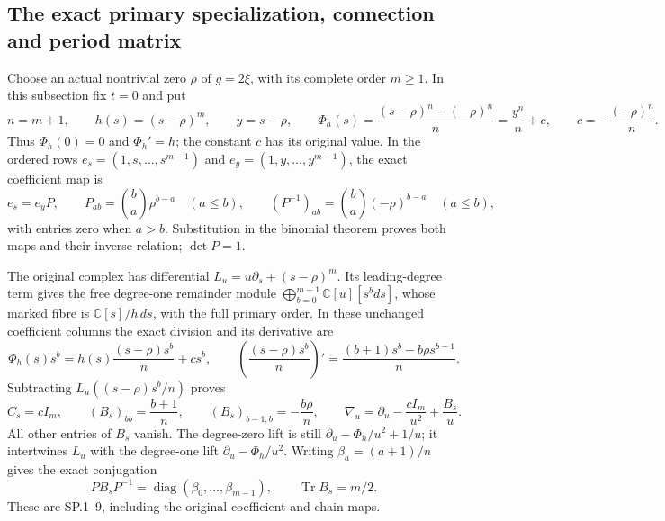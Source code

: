 \subsection{The exact primary specialization, connection and period matrix}

Choose an actual nontrivial zero \(\rho\) of \(g=2\xi\), with its
complete order \(m\geq1\).  In this subsection fix \(t=0\) and put
\[
 n=m+1,\qquad h(s)=(s-\rho)^m,\qquad
 y=s-\rho,\qquad
 \Phi_h(s)=\frac{(s-\rho)^n-(-\rho)^n}{n}
          =\frac{y^n}{n}+c,\qquad
 c=-\frac{(-\rho)^n}{n}.
\]
Thus \(\Phi_h(0)=0\) and \(\Phi_h'=h\); the constant \(c\) has its
original value.  In the ordered rows
\(e_s=(1,s,\ldots,s^{m-1})\) and
\(e_y=(1,y,\ldots,y^{m-1})\), the exact coefficient map is
\[
 e_s=e_yP,\qquad
 P_{ab}=\binom ba\rho^{b-a}\quad(a\leq b),\qquad
 (P^{-1})_{ab}=\binom ba(-\rho)^{b-a}\quad(a\leq b),
\]
with entries zero when \(a>b\).  Substitution in the binomial theorem
proves both maps and their inverse relation; \(\det P=1\).

The original complex has differential
\(L_u=u\partial_s+(s-\rho)^m\).
Its leading-degree term gives the free degree-one remainder module
\(\bigoplus_{b=0}^{m-1}\mathbb C[u][s^bds]\), whose marked fibre is
\(\mathbb C[s]/h\,ds\), with the full primary order.  In these unchanged
coefficient columns the exact division and its derivative are
\[
 \Phi_h(s)s^b
   =h(s)\frac{(s-\rho)s^b}{n}+cs^b,\qquad
 \left(\frac{(s-\rho)s^b}{n}\right)'
   =\frac{(b+1)s^b-b\rho s^{b-1}}n .
\]
Subtracting \(L_u((s-\rho)s^b/n)\) proves
\[
 C_s=cI_m,\qquad
 (B_s)_{bb}=\frac{b+1}{n},\qquad
 (B_s)_{b-1,b}=-\frac{b\rho}{n},\qquad
 \nabla_u=\partial_u-\frac{cI_m}{u^2}+\frac{B_s}{u}.
\]
All other entries of \(B_s\) vanish.  The degree-zero lift is still
\(\partial_u-\Phi_h/u^2+1/u\); it intertwines \(L_u\) with the
degree-one lift \(\partial_u-\Phi_h/u^2\).  Writing
\(\beta_a=(a+1)/n\) gives the exact conjugation
\[
 PB_sP^{-1}=\operatorname{diag}(\beta_0,\ldots,\beta_{m-1}),
 \qquad \operatorname{Tr}B_s=m/2.
\]
These are SP.1--9, including the original coefficient and chain maps.

